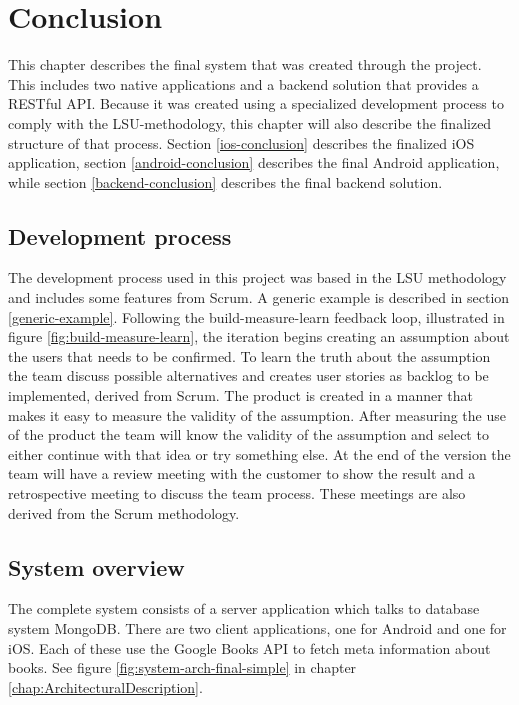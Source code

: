 \chapter{Conclusion}
\label{conclusion}
This chapter describes the final system that was created through the project. This includes two native applications and a \gls{backend} solution that provides a \gls{REST}ful \gls{API}. Because it was created using a specialized development process to comply with the \gls{LSU}-methodology, this chapter will also describe the finalized structure of that process. Section \ref{ios-conclusion} describes the finalized iOS application, section \ref{android-conclusion} describes the final Android application, while section \ref{backend-conclusion} describes the final \gls{backend} solution.


\section{Development process}
The development process used in this project was based in the \gls{LSU} methodology and includes some features from Scrum. A generic example is described in section \ref{generic-example}. Following the build-measure-learn feedback loop, illustrated in figure \ref{fig:build-measure-learn}, the iteration begins creating an assumption about the users that needs to be confirmed. To learn the truth about the assumption the team discuss possible alternatives and creates user stories as backlog to be implemented, derived from Scrum. The product is created in a manner that makes it easy to measure the validity of the assumption. After measuring the use of the product the team will know the validity of the assumption and select to  either continue with that idea or try something else. At the end of the version the team will have a review meeting with the customer to show the result and a retrospective meeting to discuss the team process. These meetings are also derived from the Scrum methodology.


\section{System overview}
\label{conclusion-system-overview}
The complete system consists of a server application which talks to database system MongoDB. There are two client applications, one for Android and one for iOS. Each of these use the Google Books \gls{API} to fetch meta information about books. See figure \ref{fig:system-arch-final-simple} in chapter \ref{chap:ArchitecturalDescription}. 

